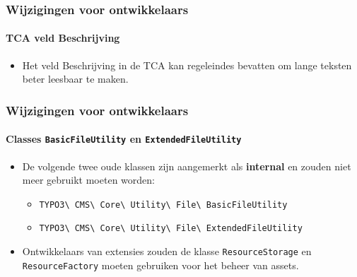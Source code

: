 
\begin{frame}[fragile]
	\frametitle{Wijzigingen voor ontwikkelaars}
	\framesubtitle{TCA veld Beschrijving}

	\begin{itemize}
		\item Het veld Beschrijving in de TCA kan regeleindes bevatten om lange teksten beter leesbaar te maken.
	\end{itemize}

\end{frame}


\begin{frame}[fragile]
	\frametitle{Wijzigingen voor ontwikkelaars}
	\framesubtitle{Classes \texttt{BasicFileUtility} en \texttt{ExtendedFileUtility}}

	\begin{itemize}
		\item De volgende twee oude klassen zijn aangemerkt als \textbf{internal}
			en zouden niet meer gebruikt moeten worden:

			\begin{itemize}\small
				\item \texttt{TYPO3\textbackslash
					CMS\textbackslash
					Core\textbackslash
					Utility\textbackslash
					File\textbackslash
					BasicFileUtility}
				\item \texttt{TYPO3\textbackslash
					CMS\textbackslash
					Core\textbackslash
					Utility\textbackslash
					File\textbackslash
					ExtendedFileUtility}
			\end{itemize}

		\item Ontwikkelaars van extensies zouden de klasse \texttt{ResourceStorage}
			en \texttt{ResourceFactory} moeten gebruiken voor het beheer van assets.

	\end{itemize}

\end{frame}


